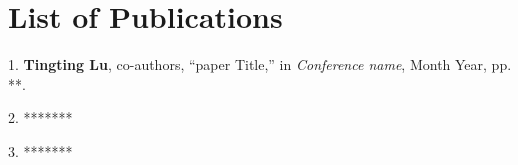 \chapter*{List of Publications}

1.  \textbf{Tingting Lu}, co-authors, ``paper Title,''  in \emph{Conference name}, Month Year, pp. **.

2. *******

3. *******
